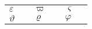 \documentclass{article}
\newcommand*\s[1]{$#1$&\texttt{\string#1}}
\begin{document}
\begin{tabular}{l@{~}ll@{~}ll@{~}l}
\s\varepsilon & \s\varpi   & \s\varsigma  \\
\s\vartheta   & \s\varrho  & \s\varphi
\end{tabular}
\end{document}
